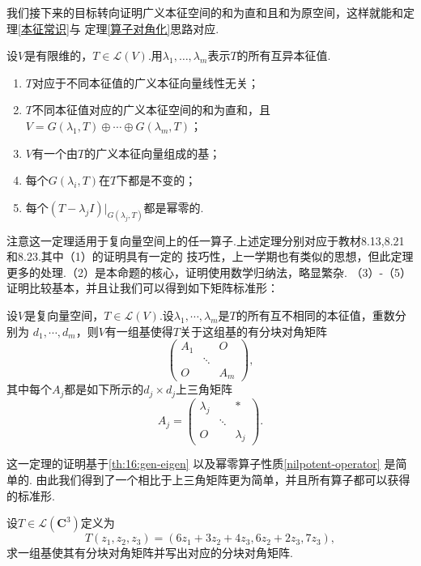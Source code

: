 我们接下来的目标转向证明广义本征空间的和为直和且和为原空间，这样就能和定理\ref{本征常识}与
定理\ref{算子对角化}思路对应.
\begin{theorem} \label{th:16:gen-eigen} %
    设$V$是有限维的，$T\in \mathcal{L}(V)$.用$\lambda_1,\ldots,\lambda_m$表示$T$的所有互异本征值.
    \begin{enumerate}
        \item $T$对应于不同本征值的广义本征向量线性无关；

        \item $T$不同本征值对应的广义本征空间的和为直和，且$V=G(\lambda_1,T)\oplus\cdots\oplus
        G(\lambda_m,T)$；

        \item $V$有一个由$T$的广义本征向量组成的基；

        \item 每个$G(\lambda_i,T)$在$T$下都是不变的；

        \item 每个$(T-\lambda_j I)\vert_{G(\lambda_j,T)}$都是幂零的.
    \end{enumerate}
\end{theorem}
注意这一定理适用于复向量空间上的任一算子.上述定理分别对应于教材8.13,8.21和8.23.其中（1）的证明具有一定的
技巧性，上一学期也有类似的思想，但此定理更多的处理.（2）是本命题的核心，证明使用数学归纳法，略显繁杂.
（3）-（5）证明比较基本，并且让我们可以得到如下矩阵标准形：
\begin{theorem}
    设$V$是复向量空间，$T\in \mathcal{L}(V)$.设$\lambda_1,\cdots,\lambda_m$是$T$的所有互不相同的本征值，重数分别为
    $d_1,\cdots,d_m$，则$V$有一组基使得$T$关于这组基的有分块对角矩阵
    $$\begin{pmatrix}
        A_1 &  & O \\  & \ddots &  \\ O &  & A_m
    \end{pmatrix},$$其中每个$A_j$都是如下所示的$d_j\times d_j$上三角矩阵
    $$A_j=\begin{pmatrix}
        \lambda_j &  & * \\  & \ddots &  \\ O &  & \lambda_j
    \end{pmatrix}.$$
\end{theorem}
这一定理的证明基于\autoref{th:16:gen-eigen} 以及幂零算子性质\autoref{nilpotent-operator} 是简单的.
由此我们得到了一个相比于上三角矩阵更为简单，并且所有算子都可以获得的标准形.
\begin{example}
    设$T\in \mathcal{L}(\mathbf{C}^3)$定义为
    \[T(z_1,z_2,z_3)=(6z_1+3z_2+4z_3,6z_2+2z_3,7z_3),\]求一组基使其有分块对角矩阵并写出对应的分块对角矩阵.
\end{example}
